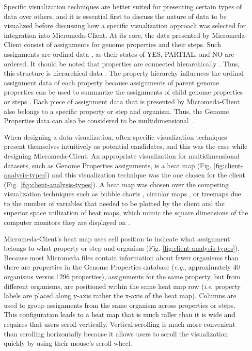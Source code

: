 Specific visualization techniques are better suited for presenting certain types 
of data over others, and it is essential first to discuss the nature of data to 
be visualized before discussing how a specific visualization approach was 
selected for integration into Micromeda-Client. At its core, the data presented 
by Micromeda-Client consist of assignments for genome properties and their 
steps. Such assignments are ordinal data 
\cite{richardson2018genome,agresti2010analysis}, as their states of YES, 
PARTIAL, and NO are ordered. It should be noted that properties are connected 
hierarchically \cite{richardson2018genome}. Thus, this structure is hierarchical 
data \cite{richardson2018genome,samet1990applications}. The property hierarchy 
influences the ordinal assignment data of each property because assignments of 
parent genome properties can be used to summarize the assignments of child 
genome properties or steps \cite{richardson2018genome}. Each piece of assignment 
data that is presented by Micromeda-Client also belongs to a specific property 
or step and organism. Thus, the Genome Properties data can also be considered to 
be multidimensional \cite{pedersen1999multidimensional}.

When designing a data visualization, often specific visualization techniques 
present themselves intuitively as potential candidates, and this was the case 
while designing Micromeda-Client. An appropriate visualization for 
multidimensional datasets, such as Genome Properties assignments, is a heat map 
\cite{wilkinson2009history,tufte2001visual}(Fig. 
\ref{fig:client-analysis-types}) and this visualization technique was the one 
chosen for the client (Fig. \ref{fig:client-analysis-types}). A heat map was 
chosen over the competing visualization techniques such as bubble charts 
\cite{tufte2001visual}, circular maps 
\cite{ward2002taxonomy,stothard2004circular}, or treemaps 
\cite{shneiderman1998tree} due to the number of variables that needed to be 
plotted by the client and the superior space utilization of heat maps, which 
mimic the square dimensions of the computer monitors they are displayed on 
\cite{muramalla2017radial}.

Micromeda-Client's heat map uses cell position to indicate what assignment 
belongs to what property or step and organism (Fig. 
\ref{fig:client-analysis-types}). Because most Micromeda files contain 
information about fewer organisms than there are properties in the Genome 
Properties database (\textit{e}.\textit{g}., approximately 40 organisms versus 
1296 properties), assignments for the same property, but from different 
organisms, are positioned within the same heat map row (\textit{i}.\textit{e}, 
property labels are placed along y-axis rather the x-axis of the heat map). 
Columns are used to group assignments from the same organism across properties 
or steps. This configuration leads to a heat map that is much taller than it is 
wide and requires that users scroll vertically. Vertical scrolling is much more 
convenient than scrolling horizontally because it allows users to scroll the 
visualization quickly by using their mouse's scroll wheel.

